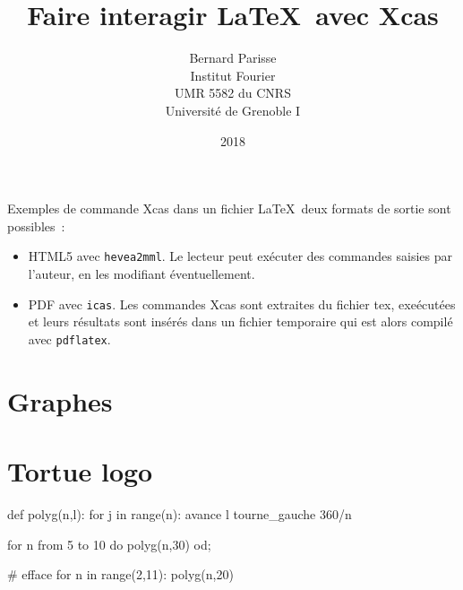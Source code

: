 \documentclass{article}
\title{Faire interagir \LaTeX\ avec Xcas}
\author{Bernard Parisse\\Institut Fourier\\UMR 5582 du
  CNRS\\Universit\'e de Grenoble I}
\date{2018}
\begin{document}
\begin{giacjshere}
\giacpython

\tableofcontents

Exemples de commande Xcas dans un fichier \LaTeX\, deux formats de sortie
sont possibles~: 
\begin{itemize}
\item HTML5 avec \verb|hevea2mml|. Le lecteur peut ex\'ecuter des
commandes saisies par l'auteur, en les modifiant \'eventuellement. 
\item PDF avec \verb|icas|. Les commandes Xcas sont extraites
du fichier tex, exe\'ecut\'ees et leurs r\'esultats sont ins\'er\'es
dans un fichier temporaire qui est alors compil\'e avec \verb|pdflatex|.
\end{itemize}

\section{Graphes}


\section{Tortue logo}
\begin{giaconload}
def polyg(n,l):
  for j in range(n):
    avance l
    tourne_gauche 360/n
\end{giaconload}
\begin{giaconloadhide}
for n from 5 to 10 do polyg(n,30) od;
\end{giaconloadhide}
\begin{giacprog}
#
efface
for n in range(2,11):
  polyg(n,20)
\end{giacprog}

\end{giacjshere}
\end{document}
